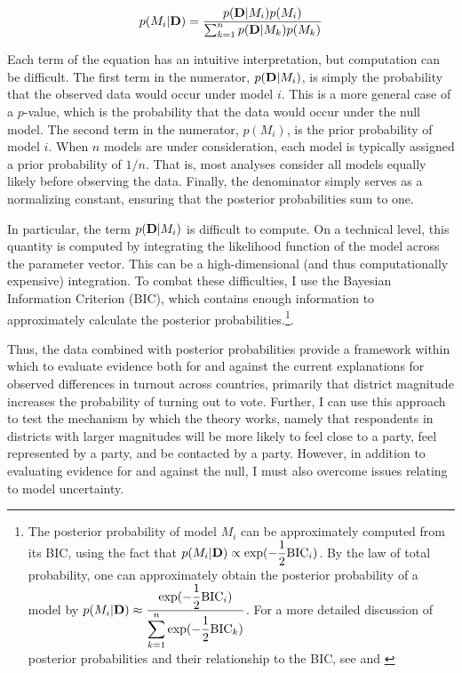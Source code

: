 \documentclass[12pt]{article}
\begin{document}
\begin{equation}
p(M_i | {\bf D}) = \dfrac{p({\bf D} | M_i)p(M_i)}{\sum_{k=1}^{n}p({\bf D} | M_k)p(M_k)}\label{eqn:PostProb}
\end{equation}

Each term of the equation has an intuitive interpretation, but computation can be difficult. The first term in the numerator, $p({\bf D} | M_i)$, is simply the probability that the observed data would occur under model $i$. This is a more general case of a $p$-value, which is the probability that the data would occur under the null model. The second term in the numerator, $p(M_i)$, is the prior probability of model $i$. When $n$ models are under consideration, each model is typically assigned a prior probability of $1/n$. That is, most analyses consider all models equally likely before observing the data. Finally, the denominator simply serves as a normalizing constant, ensuring that the posterior probabilities sum to one. 

In particular, the term $p({\bf D} | M_i)$ is difficult to compute. On a technical level, this quantity is computed by integrating the likelihood function of the model across the parameter vector. This can be a high-dimensional (and thus computationally expensive) integration. To combat these difficulties, I use the Bayesian Information Criterion (BIC), which contains enough information to approximately calculate the posterior probabilities.\footnote{The posterior probability of model $M_i$ can be approximately computed from its BIC, using the fact that $p(M_i | {\bf D}) \propto \text{exp}(-\dfrac{1}{2}\text{BIC}_i)$. By the law of total probability, one can approximately obtain the posterior probability of a model by $p(M_i | {\bf D}) \approx \dfrac{\text{exp}(-\dfrac{1}{2}\text{BIC}_i)}{\displaystyle \sum_{k = 1}^n \text{exp}(-\dfrac{1}{2}\text{BIC}_k)}$. For a more detailed discussion of posterior probabilities and their relationship to the BIC, see \cite{Raftery1995} and \cite{KassRaftery1995}}.

Thus, the data combined with posterior probabilities provide a framework within which to evaluate evidence both for and against the current explanations for observed differences in turnout across countries, primarily that district magnitude increases the probability of turning out to vote. Further, I can use this approach to test the mechanism by which the theory works, namely that respondents in districts with larger magnitudes will be more likely to feel close to a party, feel represented by a party, and be contacted by a party. However, in addition to evaluating evidence for  and against the null, I must also overcome issues relating to model uncertainty.
\end{document}
